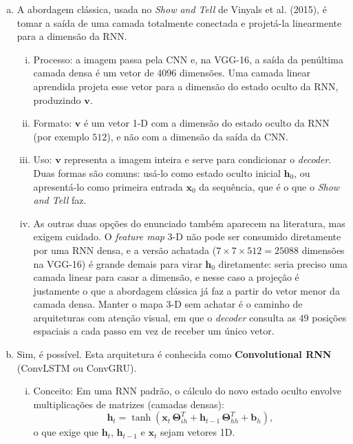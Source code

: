 \documentclass{dlproblemset}
\begin{document}
\begin{enumerate}[I)]
\begin{enumerate}[a)]
            \item A abordagem clássica, usada no \textit{Show and Tell} de Vinyals et al. (2015), é tomar a saída de uma camada totalmente conectada e projetá-la linearmente para a dimensão da RNN.
                \begin{enumerate}[i.]
                    \item Processo: a imagem passa pela CNN e, na VGG-16, a saída da penúltima camada densa é um vetor de $4096$ dimensões. Uma camada linear aprendida projeta esse vetor para a dimensão do estado oculto da RNN, produzindo $\mathbf{v}$.
                    \item Formato: $\mathbf{v}$ é um vetor 1-D com a dimensão do estado oculto da RNN (por exemplo $512$), e não com a dimensão da saída da CNN.
                    \item Uso: $\mathbf{v}$ representa a imagem inteira e serve para condicionar o \textit{decoder}. Duas formas são comuns: usá-lo como estado oculto inicial $\mathbf{h}_0$, ou apresentá-lo como primeira entrada $\mathbf{x}_0$ da sequência, que é o que o \textit{Show and Tell} faz.
                    \item As outras duas opções do enunciado também aparecem na literatura, mas exigem cuidado. O \textit{feature map} 3-D não pode ser consumido diretamente por uma RNN densa, e a versão achatada ($7 \times 7 \times 512 = 25088$ dimensões na VGG-16) é grande demais para virar $\mathbf{h}_0$ diretamente: seria preciso uma camada linear para casar a dimensão, e nesse caso a projeção é justamente o que a abordagem clássica já faz a partir do vetor menor da camada densa. Manter o mapa 3-D sem achatar é o caminho de arquiteturas com atenção visual, em que o \textit{decoder} consulta as $49$ posições espaciais a cada passo em vez de receber um único vetor.
                \end{enumerate}

            \item Sim, é possível. Esta arquitetura é conhecida como \textbf{Convolutional RNN} (ConvLSTM ou ConvGRU).
                \begin{enumerate}[i.]
                    \item Conceito: Em uma RNN padrão, o cálculo do novo estado oculto envolve multiplicações de matrizes (camadas densas):
                    $$
                    \mathbf{h}_t = \tanh(\mathbf{x}_t\,\mathbf{\Theta}_{ih}^{T} + \mathbf{h}_{t-1}\,\mathbf{\Theta}_{hh}^{T} + \mathbf{b}_h),
                    $$
                    o que exige que $\mathbf{h}_t$, $\mathbf{h}_{t-1}$ e $\mathbf{x}_t$ sejam vetores 1D.


\end{enumerate}
\end{enumerate}
\end{enumerate}
\end{document}
